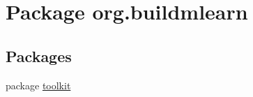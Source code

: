 \hypertarget{namespaceorg_1_1buildmlearn}{\section{Package org.\-buildmlearn}
\label{namespaceorg_1_1buildmlearn}
}
\subsection*{Packages}
\begin{DoxyCompactItemize}
\item 
package \hyperlink{namespaceorg_1_1buildmlearn_1_1toolkit}{toolkit}
\end{DoxyCompactItemize}
